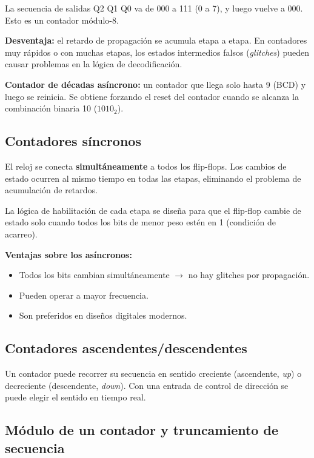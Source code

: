 La secuencia de salidas Q2 Q1 Q0 va de 000 a 111 (0 a 7), y luego vuelve a 000. Esto es un contador módulo-8.

\textbf{Desventaja:} el retardo de propagación se acumula etapa a etapa. En contadores muy rápidos o con muchas etapas, los estados intermedios falsos (\textit{glitches}) pueden causar problemas en la lógica de decodificación.

\textbf{Contador de décadas asíncrono:} un contador que llega solo hasta 9 (BCD) y luego se reinicia. Se obtiene forzando el reset del contador cuando se alcanza la combinación binaria 10 ($1010_2$).

\subsection{Contadores síncronos}

El reloj se conecta \textbf{simultáneamente} a todos los flip-flops. Los cambios de estado ocurren al mismo tiempo en todas las etapas, eliminando el problema de acumulación de retardos.


La lógica de habilitación de cada etapa se diseña para que el flip-flop cambie de estado solo cuando todos los bits de menor peso estén en 1 (condición de acarreo).

\textbf{Ventajas sobre los asíncronos:}
\begin{itemize}
    \item Todos los bits cambian simultáneamente $\rightarrow$ no hay glitches por propagación.
    \item Pueden operar a mayor frecuencia.
    \item Son preferidos en diseños digitales modernos.
\end{itemize}

\subsection{Contadores ascendentes/descendentes}

Un contador puede recorrer su secuencia en sentido creciente (ascendente, \textit{up}) o decreciente (descendente, \textit{down}). Con una entrada de control de dirección se puede elegir el sentido en tiempo real.

\subsection{Módulo de un contador y truncamiento de secuencia}

